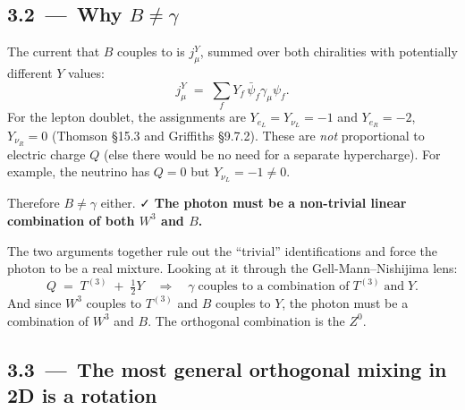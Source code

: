 \documentclass[11pt]{article}
\begin{document}
\subsection*{3.2 \,---\, Why $B \neq \gamma$}

\begin{stepbox}[title=Step 3.2: $B$ couples to weak hypercharge $Y$, not to electric charge $Q$]
The current that $B$ couples to is $j^Y_\mu$, summed over both chiralities with potentially
different $Y$ values:
\[
j^Y_\mu \;=\; \sum_f Y_f\, \bar\psi_f \gamma_\mu \psi_f .
\]
For the lepton doublet, the assignments are $Y_{e_L} = Y_{\nu_L} = -1$ and $Y_{e_R} = -2$,
$Y_{\nu_R} = 0$ (Thomson §15.3 and Griffiths §9.7.2). These are \emph{not} proportional to
electric charge $Q$ (else there would be no need for a separate hypercharge). For example,
the neutrino has $Q = 0$ but $Y_{\nu_L} = -1 \neq 0$.

Therefore $B \neq \gamma$ either. ✓ \textbf{The photon must be a non-trivial linear
combination of both $W^3$ and $B$.}
\end{stepbox}

\begin{insightbox}
The two arguments together rule out the ``trivial'' identifications and force the photon
to be a real mixture. Looking at it through the Gell-Mann--Nishijima lens:
\[
Q \;=\; T^{(3)} \;+\; \tfrac{1}{2} Y \quad\Rightarrow\quad \gamma\;\text{couples to a combination of}\; T^{(3)}\;\text{and}\;Y.
\]
And since $W^3$ couples to $T^{(3)}$ and $B$ couples to $Y$, the photon must be a combination
of $W^3$ and $B$. The orthogonal combination is the $Z^0$.
\end{insightbox}

\subsection*{3.3 \,---\, The most general orthogonal mixing in 2D is a rotation}
\end{document}
